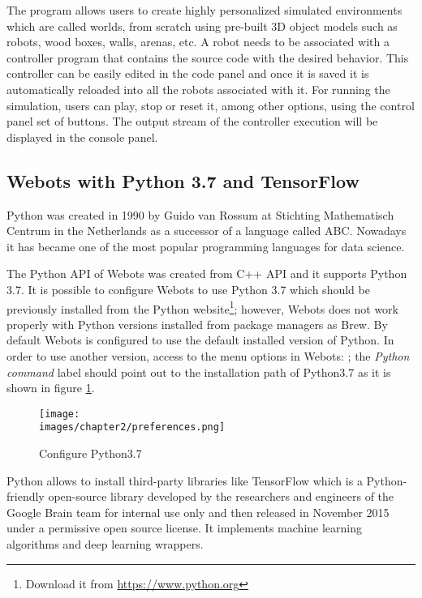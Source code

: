 The program allows users to create highly personalized simulated environments which are called worlds, from scratch using pre-built 3D object models such as robots, wood boxes, walls, arenas, etc. A robot needs to be associated with a controller program that contains the source code with the desired behavior. This controller can be easily edited in the code panel and once it is saved it is automatically reloaded into all the robots associated with it. For running the simulation, users can play, stop or reset it, among other options, using the control panel set of buttons. The output stream of the controller execution will be displayed in the console panel. 


\subsection{Webots with Python 3.7 and TensorFlow}

Python was created in 1990 by Guido van Rossum at Stichting Mathematisch Centrum in the Netherlands as a successor of a language called ABC\cite{python-docs}. Nowadays it has became one of the most popular programming languages for data science\cite{Raschka:2015:PML:2886323}.

The Python API of Webots was created from C++ API and it supports Python 3.7. It is possible to configure Webots to use Python 3.7 which should be previously installed from the Python website\footnote{Download it from \url{https://www.python.org}}; however, Webots does not work properly with Python versions installed from package managers as Brew. By default Webots is configured to use the default installed version of Python. In order to use another version, access to the menu options in Webots: ; the \textit{Python command} label should point out to the installation path of Python3.7 as it is shown in figure \ref{fig-ch-2:python}. 

\begin{figure}[ht]
	\texttt{[image: \\images/chapter2/preferences.png]}
	\caption{Configure Python3.7}
	\label{fig-ch-2:python}
\end{figure}

Python allows to install third-party libraries like TensorFlow which is a Python-friendly open-source library developed by the researchers and engineers of the Google Brain team for internal use only and  then released in November 2015 under a permissive open source license. It implements machine learning algorithms and deep learning wrappers\cite{Raschka:2015:PML:2886323}.

